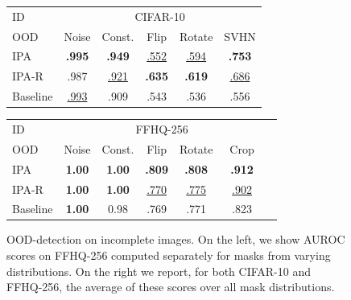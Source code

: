 \begin{figure}[t]
\begin{minipage}{.58\textwidth}
  \begin{tabular}{lccccc}
    \toprule
    ID & \multicolumn{5}{c}{CIFAR-10}  \\
    \cmidrule(r){2-6}
    OOD & Noise & Const. & Flip & Rotate & SVHN \\
    \midrule
    IPA      & \textbf{.995} & \textbf{.949} & \underline{.552} & \underline{.594} & \textbf{.753}    \\
    IPA-R    & .987         & \underline{.921}                  & \textbf{.635}    & \textbf{.619}    & \underline{.686} \\
    Baseline  & \underline{.993} & .909 & .543             & .536             & .556             \\
    \bottomrule
  \end{tabular}
  \newline
  \vspace*{.1cm}
  \newline
  \begin{tabular}{lcccccc}
    \toprule
    ID & \multicolumn{5}{c}{FFHQ-256}  \\
    \cmidrule(r){2-6}
    OOD         & Noise & Const. & Flip & Rotate & ~Crop~ \\
    \midrule
    IPA         & \textbf{1.00} & \textbf{1.00} & \textbf{.809}    & \textbf{.808}    & \textbf{.912}    \\
    IPA-R       & \textbf{1.00} & \textbf{1.00} & \underline{.770} & \underline{.775} & \underline{.902} \\
    Baseline     & \textbf{1.00} & 0.98  & .769 & .771             & .823             \\
    \bottomrule
  \end{tabular}

\end{minipage}%
\caption{OOD-detection on incomplete images. On the left, we show AUROC scores
  on FFHQ-256 computed separately for masks from varying distributions. On the
  right we report, for both CIFAR-10 and FFHQ-256, the average of these scores
  over all mask distributions.}
\label{fig:cigcvae-ood-results}
\end{figure}

